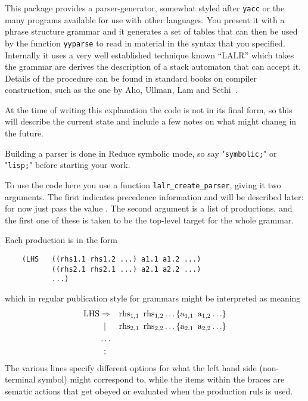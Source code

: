 
This package provides a parser-generator, somewhat styled after
\texttt{yacc} or the many programs available for use with other
languages. You present it with a phrase structure grammar and it
generates a set of tables that can then be used by the function
\texttt{yyparse} to read in material in the syntax that you specified.
Internally it uses a very well established technique known ``LALR'' which
takes the grammar are derives the description of a stack automaton that
can accept it. Details of the procedure can be found in standard books
on compiler construction, such as the one by Aho, Ullman, Lam and Sethi~\cite{dragoonBook}.

At the time of writing this explanation the code is not in its final form,
so this will describe the current state and include a few notes on what
might chaneg in the future.

Building a parser is done in Reduce symbolic mode, so say "\texttt{symbolic;}" 
or "\texttt{lisp;}" before starting your work.

\hypertarget{function:LALR_CREATE_PARSER}{}
To use the code here you use a function \texttt{lalr\_create\_parser},
giving it two arguments. The first indicates precedence information and
will be described later: for now just pass the value .
The second argument is a list of productions, and the first one of these
is taken to be the top-level target for the whole grammar.

Each production is in the form
\begin{verbatim}
    (LHS   ((rhs1.1 rhs1.2 ...) a1.1 a1.2 ...)
           ((rhs2.1 rhs2.1 ...) a2.1 a2.2 ...)
           ...)
\end{verbatim}
\noindent which in regular publication style for grammars might be interpreted
as meaning
\begin{align*}
\text{LHS} & \Rightarrow & \text{rhs}_{1,1} \hspace{0.5em} \text{rhs}_{1,2} \ldots  & \left\{ \text{a}_{1,1} \hspace{0.5em} \text{a}_{1,2} \ldots \right\} \\
    & \hspace{0.5em}| & \text{rhs}_{2,1} \hspace{0.5em} \text{rhs}_{2,2} \ldots & \left\{ \text{a}_{2,1} \hspace{0.5em} \text{a}_{2,2} \ldots \right\} \\
    & \ldots  \\
    & \hspace{0.5em};
\end{align*}
The various lines specify different options for what the left hand side
(non-terminal symbol) might correspond to, while the items within the
braces are sematic actions that get obeyed or evaluated when the
production ruls is used.

